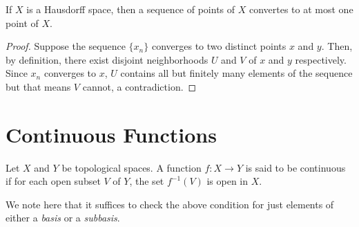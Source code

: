 \begin{theorem}
    If $X$ is a Hausdorff space, then a sequence of points of $X$ convertes to at most one point of $X$.
\end{theorem}
\begin{proof}
    Suppose the sequence $\{x_n\}$ converges to two distinct points $x$ and $y$. Then, by definition, there exist disjoint neighborhoods $U$ and $V$ of $x$ and $y$ respectively. Since $x_n$ converges to $x$, $U$ contains all but finitely many elements of the sequence but that means $V$ cannot, a contradiction.
\end{proof}


\section{Continuous Functions}
\begin{definition}
    Let $X$ and $Y$ be topological spaces. A function $f:X\to Y$ is said to be continuous if for each open subset $V$ of $Y$, the set $f^{-1}(V)$ is open in $X$.
\end{definition}

We note here that it suffices to check the above condition for just elements of either a \textit{basis} or a \textit{subbasis}.


